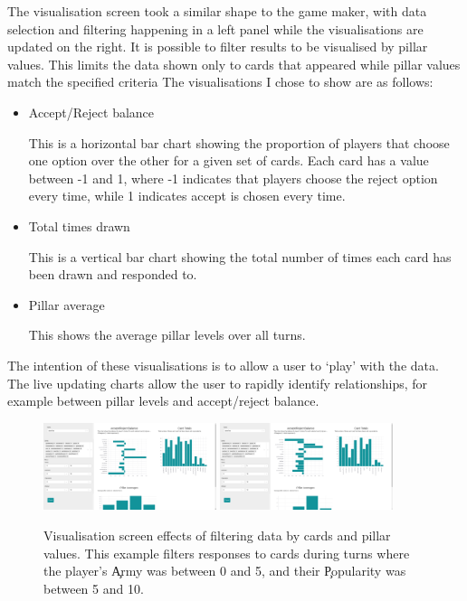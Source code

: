 The visualisation screen took a similar shape to the game maker, with data selection and filtering happening in a left panel while the visualisations are updated on the right.
It is possible to filter results to be visualised by pillar values. This limits the data shown only to cards that appeared while pillar values match the specified criteria The visualisations I chose to show are as follows:
\begin{itemize}
	\item Accept/Reject balance

	      This is a horizontal bar chart showing the proportion of players that choose one option over the other for a given set of cards. Each card has a value between -1 and 1, where -1 indicates that players choose the reject option every time, while 1 indicates accept is chosen every time.

	\item Total times drawn

	      This is a vertical bar chart showing the total number of times each card has been drawn and responded to.

	\item Pillar average

	      This shows the average pillar levels over all turns.
\end{itemize}

The intention of these visualisations is to allow a user to `play' with the data. The live updating charts allow the user to rapidly identify relationships, for example between pillar levels and accept/reject balance.

\begin{figure}[!h]
	\centering
	\includegraphics[width=0.45\textwidth]{./images/design/visualisation.png}
	\includegraphics[width=0.45\textwidth]{./images/design/visualisation_filter.png}
	\caption{Visualisation screen effects of filtering data by cards and pillar values. This example filters responses to cards during turns where the player's \c{Army} was between 0 and 5, and their \c{Popularity} was between 5 and 10.}
	\label{fig:visualisation}
\end{figure}


